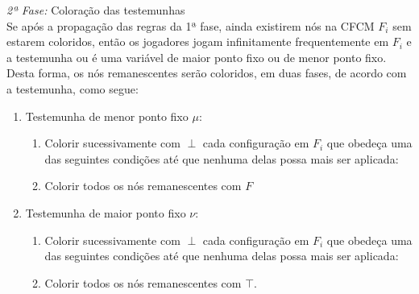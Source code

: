 \documentclass[normaltoc,capchap,capsec,times]{abnt}
\begin{document}
\begin{description}
	\item \textit{2ª Fase:} Coloração das testemunhas \\
	Se após a propagação das regras da 1ª fase, ainda existirem nós na CFCM $F_i$ sem estarem coloridos, então os jogadores jogam infinitamente frequentemente em $F_i$ e a testemunha ou é uma variável de maior ponto fixo ou de menor ponto fixo. Desta forma, os nós remanescentes serão coloridos, em duas fases, de acordo com a testemunha, como segue:
	\begin{enumerate}[label=(\arabic*),noitemsep]
		\item Testemunha de menor ponto fixo $\mu$: 
		\begin{enumerate}
			\item Colorir sucessivamente com $\perp$ cada configuração em $F_i$ que obedeça uma das seguintes condições até que nenhuma delas possa mais ser aplicada:
			\item Colorir todos os nós remanescentes com $F$
		\end{enumerate}
		\item Testemunha de maior ponto fixo $\nu$:
			\begin{enumerate}
				\item Colorir sucessivamente com $\perp$ cada configuração em $F_i$ que obedeça uma das seguintes condições até que nenhuma delas possa mais ser aplicada:
				\item Colorir todos os nós remanescentes com $\top$.
			\end{enumerate}
	\end{enumerate}
\end{description}
\end{document}
